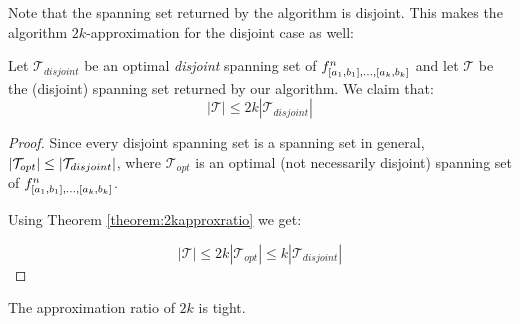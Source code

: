 Note that the spanning set returned by the algorithm
is disjoint.
This makes the algorithm $2k$-approximation
for the disjoint case as well:

\begin{theorem}
Let $\mathcal{T}_{disjoint}$ be an optimal \emph{disjoint}
spanning set of
$f^n_{[a_1, b_1], \ldots, [a_k, b_k]}$
and let $\mathcal{T}$ be the (disjoint)
spanning set returned by our algorithm.
We claim that:
\begin{equation*}
|\mathcal{T}| \leq 2k |\mathcal{T}_{disjoint}|
\end{equation*}
\end{theorem}

\begin{proof}
Since every disjoint spanning set
is a spanning set in general,
$\lvert\mathcal{T}_{opt}\rvert \leq
\lvert\mathcal{T}_{disjoint}\rvert$,
where $\mathcal{T}_{opt}$ is an optimal
(not necessarily disjoint)
spanning set of
$f^n_{[a_1, b_1], \ldots, [a_k, b_k]}$.

Using Theorem \ref{theorem:2kapproxratio} we get:

\begin{equation*}
|\mathcal{T}| \leq 2k |\mathcal{T}_{opt}|
\leq k |\mathcal{T}_{disjoint}|
\end{equation*}
\end{proof}

\begin{theorem}
The approximation ratio of $2k$ is tight.
\end{theorem}

